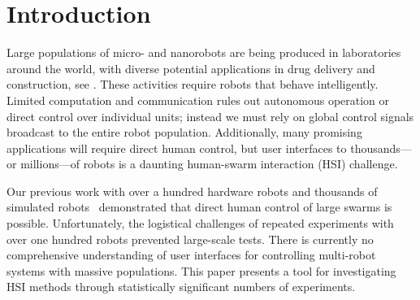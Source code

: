 \section{Introduction}\label{sec:Intro}


Large populations of micro- and nanorobots are being produced in laboratories around the world, with diverse potential applications in drug delivery and construction, see \cite{Peyer2013,Shirai2005,Chiang2011}. These activities require robots that behave intelligently.
Limited computation and communication rules out autonomous operation or direct control over individual units; instead we must rely on global control signals broadcast to the entire robot population.  Additionally, many promising applications will require direct human control, but user interfaces to thousands---or millions---of robots is a daunting human-swarm interaction (HSI) challenge. 

Our previous work with over a hundred hardware robots and thousands of simulated robots~\cite{Becker2013b} demonstrated that direct human control of large swarms is possible. 
Unfortunately, the logistical challenges of repeated experiments with over one hundred robots prevented large-scale tests. 
There is currently no comprehensive understanding of user interfaces for controlling multi-robot systems with massive populations.  
This paper presents a tool for investigating HSI methods through statistically significant numbers of experiments.  

